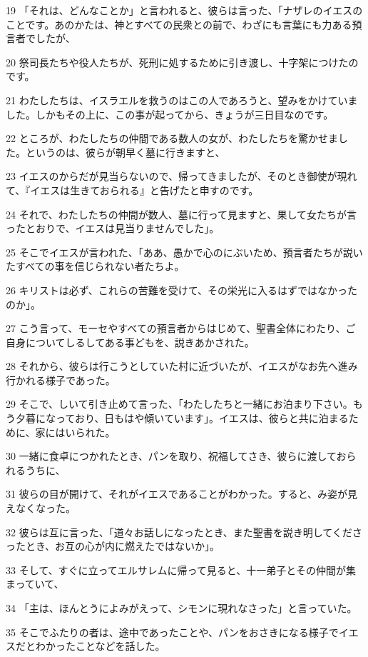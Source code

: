 \par 19 「それは、どんなことか」と言われると、彼らは言った、「ナザレのイエスのことです。あのかたは、神とすべての民衆との前で、わざにも言葉にも力ある預言者でしたが、
\par 20 祭司長たちや役人たちが、死刑に処するために引き渡し、十字架につけたのです。
\par 21 わたしたちは、イスラエルを救うのはこの人であろうと、望みをかけていました。しかもその上に、この事が起ってから、きょうが三日目なのです。
\par 22 ところが、わたしたちの仲間である数人の女が、わたしたちを驚かせました。というのは、彼らが朝早く墓に行きますと、
\par 23 イエスのからだが見当らないので、帰ってきましたが、そのとき御使が現れて、『イエスは生きておられる』と告げたと申すのです。
\par 24 それで、わたしたちの仲間が数人、墓に行って見ますと、果して女たちが言ったとおりで、イエスは見当りませんでした」。
\par 25 そこでイエスが言われた、「ああ、愚かで心のにぶいため、預言者たちが説いたすべての事を信じられない者たちよ。
\par 26 キリストは必ず、これらの苦難を受けて、その栄光に入るはずではなかったのか」。
\par 27 こう言って、モーセやすべての預言者からはじめて、聖書全体にわたり、ご自身についてしるしてある事どもを、説きあかされた。
\par 28 それから、彼らは行こうとしていた村に近づいたが、イエスがなお先へ進み行かれる様子であった。
\par 29 そこで、しいて引き止めて言った、「わたしたちと一緒にお泊まり下さい。もう夕暮になっており、日もはや傾いています」。イエスは、彼らと共に泊まるために、家にはいられた。
\par 30 一緒に食卓につかれたとき、パンを取り、祝福してさき、彼らに渡しておられるうちに、
\par 31 彼らの目が開けて、それがイエスであることがわかった。すると、み姿が見えなくなった。
\par 32 彼らは互に言った、「道々お話しになったとき、また聖書を説き明してくださったとき、お互の心が内に燃えたではないか」。
\par 33 そして、すぐに立ってエルサレムに帰って見ると、十一弟子とその仲間が集まっていて、
\par 34 「主は、ほんとうによみがえって、シモンに現れなさった」と言っていた。
\par 35 そこでふたりの者は、途中であったことや、パンをおさきになる様子でイエスだとわかったことなどを話した。
